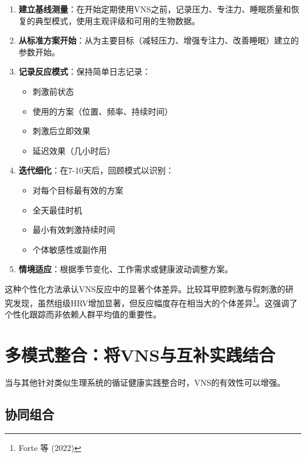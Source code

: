 \documentclass[
  Letterpaper,
]{scrbook}
\providecommand{\tightlist}{%
  \setlength{\itemsep}{0pt}\setlength{\parskip}{0pt}}\usepackage{longtable,booktabs,array}
\begin{document}
\begin{enumerate}
\def\labelenumi{\arabic{enumi}.}
\item
  \textbf{建立基线测量}：在开始定期使用VNS之前，记录压力、专注力、睡眠质量和恢复的典型模式，使用主观评级和可用的生物数据。
\item
  \textbf{从标准方案开始}：从为主要目标（减轻压力、增强专注力、改善睡眠）建立的参数开始。
\item
  \textbf{记录反应模式}：保持简单日志记录：

  \begin{itemize}
  \tightlist
  \item
    刺激前状态
  \item
    使用的方案（位置、频率、持续时间）
  \item
    刺激后立即效果
  \item
    延迟效果（几小时后）
  \end{itemize}
\item
  \textbf{迭代细化}：在7-10天后，回顾模式以识别：

  \begin{itemize}
  \tightlist
  \item
    对每个目标最有效的方案
  \item
    全天最佳时机
  \item
    最小有效刺激持续时间
  \item
    个体敏感性或副作用
  \end{itemize}
\item
  \textbf{情境适应}：根据季节变化、工作需求或健康波动调整方案。
\end{enumerate}

这种个性化方法承认VNS反应中的显著个体差异。比较耳甲腔刺激与假刺激的研究发现，虽然组级HRV增加显著，但反应幅度存在相当大的个体差异\footnote{Forte
  等 (2022)}。这强调了个性化跟踪而非依赖人群平均值的重要性。

\section{多模式整合：将VNS与互补实践结合}\label{ux591aux6a21ux5f0fux6574ux5408ux5c06vnsux4e0eux4e92ux8865ux5b9eux8df5ux7ed3ux5408}

当与其他针对类似生理系统的循证健康实践整合时，VNS的有效性可以增强。

\subsection{协同组合}\label{ux534fux540cux7ec4ux5408}
\end{document}
